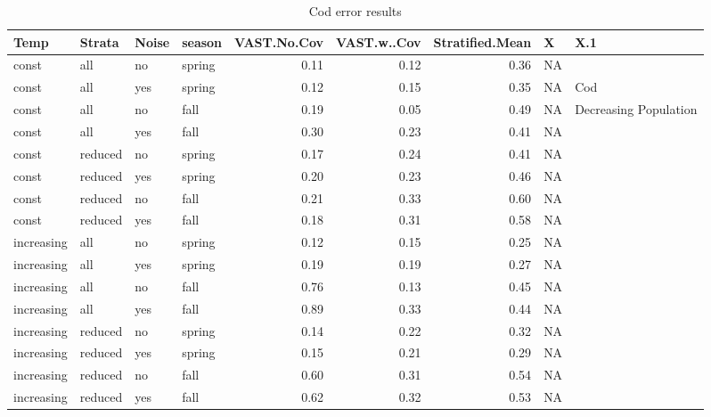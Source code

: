 \documentclass[
  12pt,
]{article}
\begin{document}
\begin{table}

\caption{\label{tab:unnamed-chunk-1}Cod error results}
\centering
\begin{tabular}[t]{l|l|l|l|r|r|r|l|l}
\hline
Temp & Strata & Noise & season & VAST.No.Cov & VAST.w..Cov & Stratified.Mean & X & X.1\\
\hline
const & all & no & spring & 0.11 & 0.12 & 0.36 & NA & \\
\hline
const & all & yes & spring & 0.12 & 0.15 & 0.35 & NA & Cod\\
\hline
const & all & no & fall & 0.19 & 0.05 & 0.49 & NA & Decreasing Population\\
\hline
const & all & yes & fall & 0.30 & 0.23 & 0.41 & NA & \\
\hline
const & reduced & no & spring & 0.17 & 0.24 & 0.41 & NA & \\
\hline
const & reduced & yes & spring & 0.20 & 0.23 & 0.46 & NA & \\
\hline
const & reduced & no & fall & 0.21 & 0.33 & 0.60 & NA & \\
\hline
const & reduced & yes & fall & 0.18 & 0.31 & 0.58 & NA & \\
\hline
increasing & all & no & spring & 0.12 & 0.15 & 0.25 & NA & \\
\hline
increasing & all & yes & spring & 0.19 & 0.19 & 0.27 & NA & \\
\hline
increasing & all & no & fall & 0.76 & 0.13 & 0.45 & NA & \\
\hline
increasing & all & yes & fall & 0.89 & 0.33 & 0.44 & NA & \\
\hline
increasing & reduced & no & spring & 0.14 & 0.22 & 0.32 & NA & \\
\hline
increasing & reduced & yes & spring & 0.15 & 0.21 & 0.29 & NA & \\
\hline
increasing & reduced & no & fall & 0.60 & 0.31 & 0.54 & NA & \\
\hline
increasing & reduced & yes & fall & 0.62 & 0.32 & 0.53 & NA & \\
\hline
\end{tabular}
\end{table}
\end{document}
